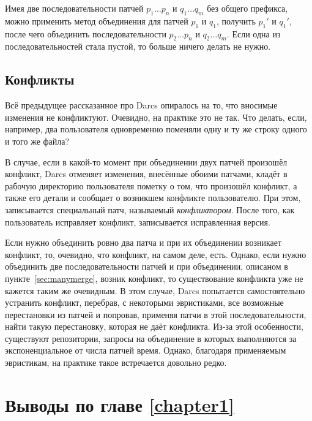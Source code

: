 Имея две последовательности патчей $p_1\ldots p_n$ и $q_1\ldots q_m$
без общего префикса, можно применить метод объединения для патчей
$p_1$ и $q_1$, получить $p_1'$ и $q_1'$, после чего объединить
последовательности $p_2\ldots p_n$ и $q_2\ldots q_m$. Если одна из
последовательностей стала пустой, то больше ничего делать не нужно.

\subsection{Конфликты}

Всё предыдущее рассказанное про Darcs опиралось на то, что вносимые
изменения не конфликтуют. Очевидно, на практике это не так. Что
делать, если, например, два пользователя одновременно поменяли одну и
ту же строку одного и того же файла?

В случае, если в какой-то момент при объединении двух патчей произошёл
конфликт, Darcs отменяет изменения, внесённые обоими патчами, кладёт в
рабочую директорию пользователя пометку о том, что произошёл конфликт,
а также его детали и сообщает о возникшем конфликте пользователю. При
этом, записывается специальный патч, называемый \emph{конфликтором}.
После того, как пользователь исправляет конфликт, записывается
исправленная версия. 

Если нужно объединить ровно два патча и при их объединении возникает
конфликт, то, очевидно, что конфликт, на самом деле, есть. Однако,
если нужно объединить две последовательности патчей и при объединении,
описаном в пункте~\ref{sec:manymerge}, возник конфликт, то
существование конфликта уже не кажется таким же очевидным. В этом
случае, Darcs попытается самостоятельно устранить конфликт, перебрав,
с некоторыми эвристиками, все возможные перестановки из патчей и
попровав, применяя патчи в этой последовательности, найти такую
перестановку, которая не даёт конфликта. Из-за этой особенности,
существуют репозитории, запросы на объединение в которых выполняются
за экспоненциальное от числа патчей время. Однако, благодаря
применяемым эвристикам, на практике такое встречается довольно редко.

\section{Выводы по главе \ref{chapter1}}
